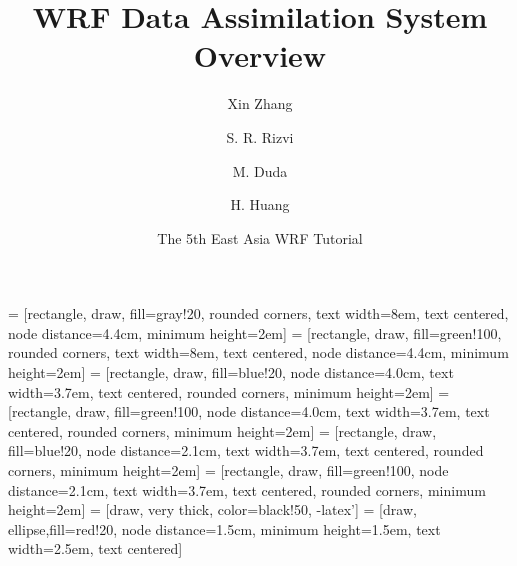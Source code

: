 \documentclass{beamer}
\begin{document}
\title[WRFDA System]{WRF Data Assimilation System Overview}

\author[Xin Zhang et al.]{Xin Zhang \and S. R. Rizvi \and M. Duda \and H. Huang}
\date{The 5th East Asia WRF Tutorial}

 = [rectangle, draw, fill=gray!20, rounded corners,
    text width=8em, text centered, node distance=4.4cm, minimum height=2em]
 = [rectangle, draw, fill=green!100, rounded corners,
    text width=8em, text centered, node distance=4.4cm, minimum height=2em]
 = [rectangle, draw, fill=blue!20, node distance=4.0cm, 
    text width=3.7em, text centered, rounded corners, minimum height=2em]
 = [rectangle, draw, fill=green!100, node distance=4.0cm, 
    text width=3.7em, text centered, rounded corners, minimum height=2em]
 = [rectangle, draw, fill=blue!20, node distance=2.1cm, 
    text width=3.7em, text centered, rounded corners, minimum height=2em]
 = [rectangle, draw, fill=green!100, node distance=2.1cm, 
    text width=3.7em, text centered, rounded corners, minimum height=2em]
 = [draw, very thick, color=black!50, -latex']
 = [draw, ellipse,fill=red!20, node distance=1.5cm,
    minimum height=1.5em, text width=2.5em, text centered]
\end{document}
